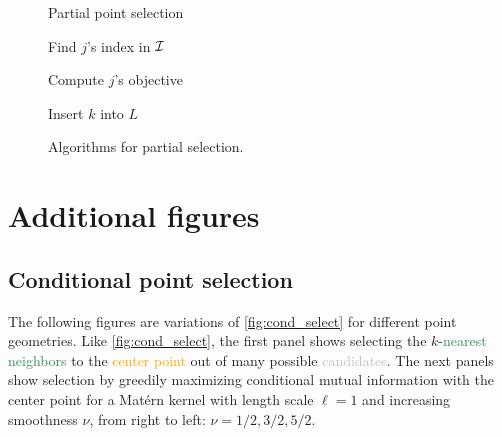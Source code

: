 \documentclass[review,supplement,onefignum,onetabnum]{siamonline220329}
\begin{document}
\begin{figure}[H]
  \centering
  \begin{minipage}[t]{0.49\textwidth}
    \begin{algorithm}[H]
      \caption{Partial point selection}
      \label{alg:select_partial}
      
    \end{algorithm}

    \begin{algorithm}[H]
      \caption{Find \( j \)'s index in \( \mathcal{I} \)}
      \label{alg:insert_index}
      
    \end{algorithm}
  \end{minipage}
  \hfill
  \begin{minipage}[t]{0.49\textwidth}
    \begin{algorithm}[H]
      \caption{Compute \( j \)'s objective}
      \label{alg:partial_score}
      
    \end{algorithm}
    \vspace{-7pt}
    \begin{algorithm}[H]
      \caption{Insert \( k \) into \( L \)}
      \label{alg:chol_insert}
      
    \end{algorithm}
  \end{minipage}
  \caption{Algorithms for partial selection.}
  \label{fig:alg_partial_select}
\end{figure}

\newpage

\section{Additional figures}

\subsection{Conditional point selection}

The following figures are variations of \cref{fig:cond_select} for
different point geometries. Like \cref{fig:cond_select}, the first
panel shows selecting the \( k \)-\textcolor{seagreen}{nearest
neighbors} to the \textcolor{orange}{center point} out of many possible
\textcolor{silver}{candidates}. The next panels show selection by greedily
maximizing conditional mutual information with the center point for a
Mat{\'e}rn kernel with length scale \( \ell = 1 \) and increasing smoothness
\( \nu \), from right to left: \( \nu = 1/2, 3/2, 5/2 \).
\end{document}

